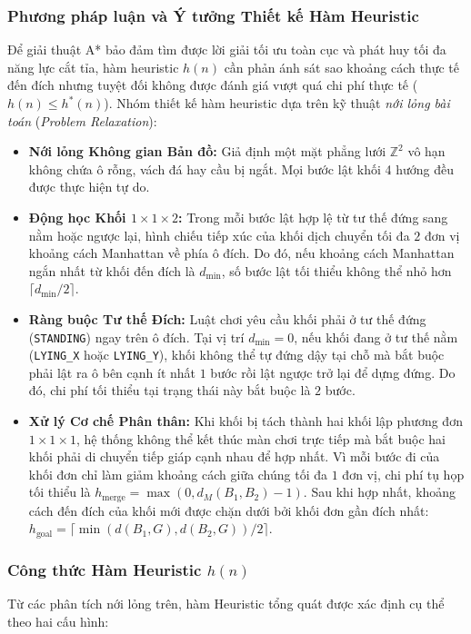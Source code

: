 \subsubsection{Phương pháp luận và Ý tưởng Thiết kế Hàm Heuristic}
Để giải thuật A* bảo đảm tìm được lời giải tối ưu toàn cục và phát huy tối đa
năng lực cắt tỉa, hàm heuristic $h(n)$ cần phản ánh sát sao khoảng cách thực tế
đến đích nhưng tuyệt đối không được đánh giá vượt quá chi phí thực tế ($h(n) \le h^*(n)$).
Nhóm thiết kế hàm heuristic dựa trên kỹ thuật \textit{nới lỏng bài toán} (\textit{Problem Relaxation}):
\begin{itemize}[--]
    \item \textbf{Nới lỏng Không gian Bản đồ:} Giả định một mặt phẳng lưới $\mathbb{Z}^2$ vô hạn
    không chứa ô rỗng, vách đá hay cầu bị ngắt. Mọi bước lật khối 4 hướng đều được thực hiện tự do.
    
    \item \textbf{Động học Khối $1 \times 1 \times 2$:} Trong mỗi bước lật hợp lệ từ tư thế đứng
    sang nằm hoặc ngược lại, hình chiếu tiếp xúc của khối dịch chuyển tối đa $2$ đơn vị khoảng cách
    Manhattan về phía ô đích. Do đó, nếu khoảng cách Manhattan ngắn nhất từ khối đến đích là $d_{\min}$,
    số bước lật tối thiểu không thể nhỏ hơn $\lceil d_{\min} / 2 \rceil$.
    
    \item \textbf{Ràng buộc Tư thế Đích:} Luật chơi yêu cầu khối phải ở tư thế đứng (\texttt{STANDING})
    ngay trên ô đích. Tại vị trí $d_{\min} = 0$, nếu khối đang ở tư thế nằm (\texttt{LYING\_X} hoặc
    \texttt{LYING\_Y}), khối không thể tự đứng dậy tại chỗ mà bắt buộc phải lật ra ô bên cạnh ít nhất
    $1$ bước rồi lật ngược trở lại để dựng đứng. Do đó, chi phí tối thiểu tại trạng thái này bắt buộc là $2$ bước.
    
    \item \textbf{Xử lý Cơ chế Phân thân:} Khi khối bị tách thành hai khối lập phương đơn $1 \times 1 \times 1$,
    hệ thống không thể kết thúc màn chơi trực tiếp mà bắt buộc hai khối phải di chuyển tiếp giáp cạnh nhau
    để hợp nhất. Vì mỗi bước đi của khối đơn chỉ làm giảm khoảng cách giữa chúng tối đa $1$ đơn vị,
    chi phí tụ họp tối thiểu là $h_{\text{merge}} = \max(0, d_M(B_1, B_2) - 1)$. Sau khi hợp nhất,
    khoảng cách đến đích của khối mới được chặn dưới bởi khối đơn gần đích nhất:
    $h_{\text{goal}} = \lceil \min(d(B_1, G), d(B_2, G)) / 2 \rceil$.
\end{itemize}

\subsubsection{\texorpdfstring{Công thức Hàm Heuristic $h(n)$}%
{Cong thuc Ham Heuristic h(n)}}
Từ các phân tích nới lỏng trên, hàm Heuristic tổng quát được xác định cụ thể theo hai cấu hình:

